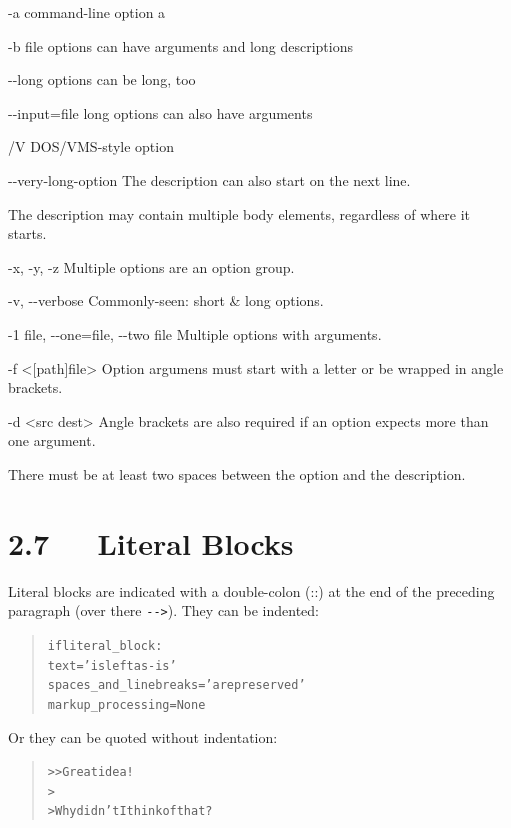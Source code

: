 \documentclass[a4paper]{memoir}
\providecommand*{\DUoptionlistlabel}[1]{\bfseries #1 \hfill}
\newenvironment{DUoptionlist}{%
    \list{}{\setlength{\labelwidth}{\DUoptionlistindent}
            \setlength{\rightmargin}{1cm}
            \setlength{\leftmargin}{\rightmargin}
            \addtolength{\leftmargin}{\labelwidth}
            \addtolength{\leftmargin}{\labelsep}
            \renewcommand{\makelabel}{\DUoptionlistlabel}}
  }
  {\endlist}
\begin{document}
\begin{DUoptionlist}
\item[-a]  command-line option \textquotedbl{}a\textquotedbl{}
\item[-b file]  options can have arguments
and long descriptions
\item[-{}-long]  options can be long, too
\item[-{}-input=file]  long options can also have arguments
\item[/V]  DOS/VMS-style option
\item[-{}-very-long-option]  The description can also start on the next line.

The description may contain multiple body elements,
regardless of where it starts.
\item[-x, -y, -z]  Multiple options are an \textquotedbl{}option group\textquotedbl{}.
\item[-v, -{}-verbose]  Commonly-seen: short \& long options.
\item[-1 file, -{}-one=file, -{}-two file]  Multiple options with arguments.
\item[-f <{[}path{]}file>]  Option argumens must start with a letter
or be wrapped in angle brackets.
\item[-d <src dest>]  Angle brackets are also required if an
option expects more than one argument.
\end{DUoptionlist}

There must be at least two spaces between the option and the
description.


\section{2.7   Literal Blocks}

Literal blocks are indicated with a double-colon (\textquotedbl{}::\textquotedbl{}) at the end of
the preceding paragraph (over there \texttt{-{}->}).  They can be indented:

\begin{quote}
\begin{alltt}
if literal_block:
    text = 'is left as-is'
    spaces_and_linebreaks = 'are preserved'
    markup_processing = None
\end{alltt}
\end{quote}

Or they can be quoted without indentation:

\begin{quote}
\begin{alltt}
>> Great idea!
>
> Why didn't I think of that?
\end{alltt}
\end{quote}
\end{document}
